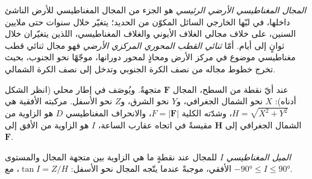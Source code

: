 \begin{definition}\label{def:b3:palaeomagnetism:main-field}
\emph{المجال المغناطيسي الأرضي الرئيسي} هو الجزء من
المجال المغناطيسي للأرض الناشئ داخلها، في لبّها الخارجي السائل المكوّن من الحديد؛
يتغيّر خلال سنوات حتى ملايين السنين، على خلاف مجالي الغلاف الأيوني
والغلاف المغناطيسي، اللذين يتغيّران خلال ثوانٍ إلى أيام. أمّا
\emph{ثنائي القطب المحوري المركزي الأرضي} فهو مجال ثنائي قطب مغناطيسي موضوع
في مركز الأرض ومحاذٍ لمحور دورانها،
موجّهًا نحو الجنوب، بحيث تخرج خطوط مجاله من نصف الكرة الجنوبي
وتدخل إلى نصف الكرة الشمالي.
\end{definition}

عند أيّ نقطة من السطح، المجال $\mathbf F$ متجهةٌ. ويُوصَف في إطار محلي (انظر الشكل أدناه):
$X$ نحو الشمال الجغرافي، و$Y$ نحو الشرق،
و$Z$ نحو الأسفل. مركبته الأفقية هي $H = \sqrt{X^2 + Y^2}$، وشدّته
الكلية $F = |\mathbf F|$، والانحراف المغناطيسي $D$ هو الزاوية من
الشمال الجغرافي إلى $\mathbf H$ مقيسةً في اتجاه عقارب الساعة،  $I$
هو الزاوية من الأفق إلى $\mathbf F$.

\begin{definition}\label{def:b3:palaeomagnetism:inclination}
\emph{الميل المغناطيسي} $I$ للمجال عند
نقطةٍ ما هي الزاوية بين متجهة المجال والمستوى الأفقي،
موجبةً عندما يتّجه المجال نحو الأسفل: $\tan I = Z/H$، مع $-\ang{90} \le I
\le \ang{90}$.
\end{definition}


